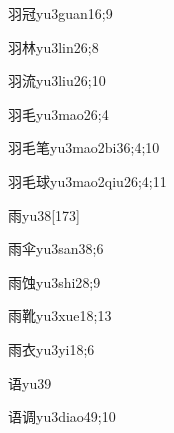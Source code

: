 \begin{verbete}{羽冠}{yu3guan1}{6;9}
\end{verbete}

\begin{verbete}{羽林}{yu3lin2}{6;8}
\end{verbete}

\begin{verbete}{羽流}{yu3liu2}{6;10}
\end{verbete}

\begin{verbete}{羽毛}{yu3mao2}{6;4}
\end{verbete}

\begin{verbete}{羽毛笔}{yu3mao2bi3}{6;4;10}
\end{verbete}

\begin{verbete}{羽毛球}{yu3mao2qiu2}{6;4;11}
\end{verbete}

\begin{verbete}{雨}{yu3}{8}[173]
\end{verbete}

\begin{verbete}{雨伞}{yu3san3}{8;6}
\end{verbete}

\begin{verbete}{雨蚀}{yu3shi2}{8;9}
\end{verbete}

\begin{verbete}{雨靴}{yu3xue1}{8;13}
\end{verbete}

\begin{verbete}{雨衣}{yu3yi1}{8;6}
\end{verbete}

\begin{verbete}{语}{yu3}{9}
\end{verbete}

\begin{verbete}{语调}{yu3diao4}{9;10}
\end{verbete}

